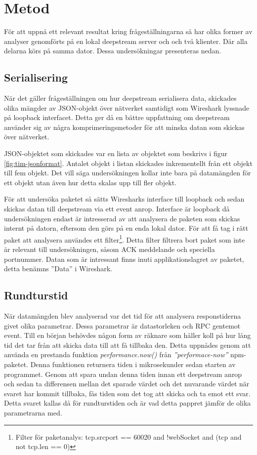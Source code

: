 \section{Metod}
\label{sec:tim-method}
För att uppnå ett relevant resultat kring frågeställningarna så har olika former av analyser genomförts på en lokal deepstream server och och två klienter. Där alla delarna körs på samma dator. Dessa undersökningar presenteras nedan.

\subsection{Serialisering}
\label{subsec:tim-method-serializing}
När det gäller frågeställningen om hur deepstream serialisera data, skickades olika mängder av JSON-objekt över nätverket samtidigt som Wireshark lyssnade på loopback interfacet. Detta ger då en bättre uppfattning om deepstream använder sig av några komprimeringsmetoder för att minska datan som skickas över nätverket.

JSON-objektet som skickades var en lista av objektet som beskrivs i figur \ref{fig:tim-jsonformat}. Antalet objekt i listan skickades inkrementellt från ett objekt till fem objekt. Det vill säga undersökningen kollar inte bara på datamängden för ett objekt utan även hur detta skalas upp till fler objekt. 

För att undersöka paketet så sätts Wiresharks interface till loopback och sedan skickas datan till deepstream via ett event anrop. Interface är loopback då undersökningen endast är intresserad av att analysera de paketen som skickas internt på datorn, eftersom den görs på en enda lokal dator. För att få tag i rätt paket att analysera användes ett filter\footnote{Filter för paketanalys: tcp.srcport == 60020 and !webSocket and (tcp and not tcp.len == 0)}. Detta filter filtrera bort paket som inte är relevant till undersökningen, såsom ACK meddelande och speciella portnummer. Datan som är intressant finns inuti applikationslagret av paketet, detta benämns ''Data'' i Wireshark.

\subsection{Rundturstid}
\label{subsec:tim-method-response}
När datamängden blev analyserad var det tid för att analysera responstiderna givet olika parametrar. Dessa parametrar är datastorleken och RPC gentemot event. Till en början behövdes någon form av räknare som håller koll på hur lång tid det tar från att skicka data till att få tillbaka den. Detta uppnådes genom att använda en prestanda funktion \textit{performance.now()} från \textit{''performace-now''}\cite{performance-now} npm-paketet. Denna funktionen returnera tiden i mikrosekunder sedan starten av programmet. Genom att spara undan denna tiden innan ett deepstream anrop och sedan ta differensen mellan det sparade värdet och det nuvarande värdet när svaret har kommit tillbaka, fås tiden som det tog att skicka och ta emot ett svar. Detta svaret kallas då för rundturstiden och är vad detta pappret jämför de olika parametrarna med. 

